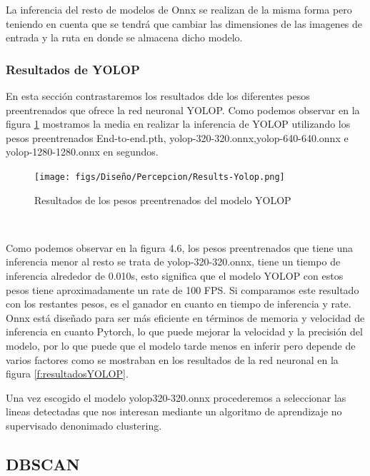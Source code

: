         La inferencia del resto de modelos de Onnx se realizan de la misma forma pero teniendo en cuenta que se tendrá que cambiar las dimensiones de las imagenes de entrada y la ruta
        en donde se almacena dicho modelo. 


\subsubsection{Resultados de YOLOP }
\label{sec:resultados}
En esta sección contrastaremos los resultados dde los diferentes pesos preentrenados que ofrece la red neuronal YOLOP. Como podemos observar en la figura \ref{fig:pesos_preentrenados} 
mostramos la media en realizar la inferencia de YOLOP utilizando los pesos preentrenados End-to-end.pth, yolop-320-320.onnx,yolop-640-640.onnx e yolop-1280-1280.onnx en segundos.

\begin{figure} [H]
  \begin{center}
    \texttt{[image: figs/Diseño/Percepcion/Results-Yolop.png]}
  \end{center}
  \caption{Resultados de los pesos preentrenados del modelo YOLOP}
  \label{fig:pesos_preentrenados}
\end{figure}\

Como podemos observar en la figura 4.6, los pesos preentrenados que tiene una inferencia menor al resto se trata de yolop-320-320.onnx, tiene un tiempo de inferencia alrededor de 0.010s, esto
significa que el modelo YOLOP con estos pesos tiene aproximadamente un rate de 100 FPS. Si comparamos este resultado con los restantes pesos, es el ganador en cuanto 
en tiempo de inferencia y rate. 
Onnx está diseñado para ser más eficiente en términos de memoria y velocidad de inferencia en cuanto Pytorch, lo que puede mejorar la velocidad y la precisión
del modelo, por lo que puede que el modelo tarde menos en inferir pero depende de varios factores como se mostraban en los resultados de la red neuronal 
en la figura \ref{f:resultadosYOLOP}. \newline

Una vez escogido el modelo yolop320-320.onnx procederemos a seleccionar las lineas detectadas que nos interesan mediante un algoritmo de aprendizaje no supervisado denonimado clustering.

\subsection{DBSCAN}
\label{sec:DBSCAN}

